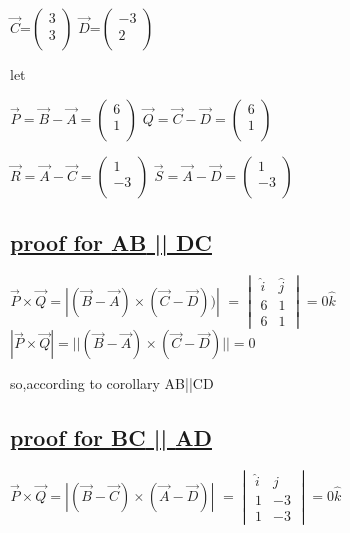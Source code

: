 \documentclass[journal,12pt,twocolumn]{IEEEtran}
\begin{document}
$ \vec{C} $=$\begin{pmatrix}3 \\ 3 \\ \end{pmatrix}$ \hspace{0.3cm} $ \vec{D} $=$\begin{pmatrix}-3 \\ 2 \\ \end{pmatrix}$ 
\vspace{0.2cm}


let

$ \vec{P} =\vec{B}-\vec{A}=\begin{pmatrix}6 \\ 1 \\ \end{pmatrix}$ \hspace{0.3cm}$ \vec{Q}= \vec{C}-\vec{D}=\begin{pmatrix}6 \\ 1 \\ \end{pmatrix}$ 

$ \vec{R} = \vec{A}-\vec{C}=\begin{pmatrix}1 \\ -3 \\ \end{pmatrix}$ \hspace{0.3cm}$ \vec{S}= \vec{A}-\vec{D}=\begin{pmatrix}1 \\ -3 \\ \end{pmatrix}$ 

\subsection{\underline{proof for  \textbf{AB} || \textbf{DC}}}
\boldmath
$ \vec{P}\times \vec{Q}=|(\vec{B}-\vec{A})\times (\vec{C}-\vec{D}))|$
$ = \begin{vmatrix}
           \hat{i} & \hat{j}\\
            6 & 1\\
            6 & 1
    \end{vmatrix} = {0\hat{k}}  $
\vspace{0.2cm}
$ |\vec{P}\times \vec{Q}|=||(\vec{B}-\vec{A})\times (\vec{C}-\vec{D})||=0$
\unboldmath

so,according to corollary AB||CD


\subsection{\underline{proof for  \textbf{BC} || \textbf{AD}}}
\boldmath
$\vec{P}\times \vec{Q}=|(\vec{B}-\vec{C})\times (\vec{A}-\vec{D})|$
$ = \begin{vmatrix}
           \hat{i} & \hat{j}\\
            1 & -3\\
            1 & -3
    \end{vmatrix} = {0\hat{k}}  $
\end{document}
